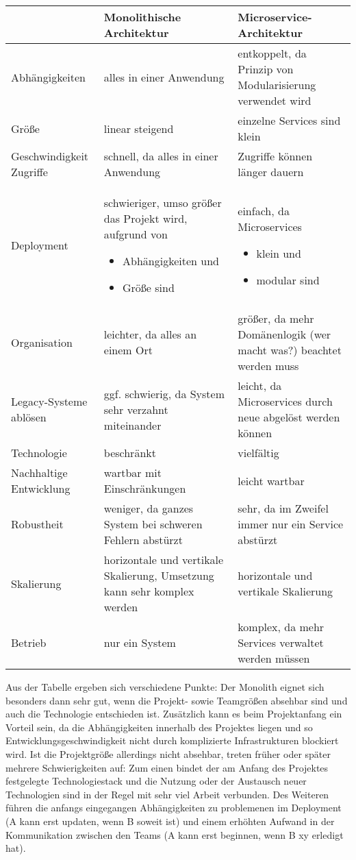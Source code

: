\begin{center}
	\begin{tabular}{p{5cm}p{5cm}p{5cm}}
		& Monolithische Architektur & Microservice-Architektur \\ \hline
		Abhängigkeiten & alles in einer Anwendung & entkoppelt, da Prinzip von Modularisierung verwendet wird \\
		Größe & linear steigend & einzelne Services sind klein \\
		Geschwindigkeit Zugriffe & schnell, da alles in einer Anwendung & Zugriffe können länger dauern \\ 
		Deployment & schwieriger, umso größer das Projekt wird, aufgrund von
		\begin{itemize}
			\item Abhängigkeiten und 
			\item Größe sind \end{itemize}
		 & einfach, da Microservices \begin{itemize}
			\item klein und 
		    \item modular sind \end{itemize} \\
		Organisation & leichter, da alles an einem Ort & größer, da mehr Domänenlogik (wer macht was?) beachtet werden muss \\
		Legacy-Systeme ablösen & ggf. schwierig, da System sehr verzahnt miteinander & leicht, da Microservices durch neue abgelöst werden können \\
		Technologie & beschränkt & vielfältig \\
		Nachhaltige Entwicklung & wartbar mit Einschränkungen & leicht wartbar \\
		Robustheit & weniger, da ganzes System bei schweren Fehlern abstürzt & sehr, da im Zweifel immer nur ein Service abstürzt \\
		Skalierung & horizontale und vertikale Skalierung, Umsetzung kann sehr komplex werden &  horizontale und vertikale Skalierung \\
		Betrieb & nur ein System & komplex, da mehr Services verwaltet werden müssen
	\end{tabular}
\end{center}


Aus der Tabelle ergeben sich verschiedene Punkte: Der Monolith eignet sich besonders dann sehr gut, wenn die Projekt- sowie Teamgrößen absehbar sind und auch die Technologie entschieden ist. Zusätzlich kann es beim Projektanfang ein Vorteil sein, da die Abhängigkeiten innerhalb des Projektes liegen und so Entwicklungsgeschwindigkeit nicht durch komplizierte Infrastrukturen blockiert wird. 
Ist die Projektgröße allerdings nicht absehbar, treten früher oder später mehrere Schwierigkeiten auf: Zum einen bindet der am Anfang des Projektes festgelegte Technologiestack und die Nutzung oder der Austausch neuer Technologien sind in der Regel mit sehr viel Arbeit verbunden. Des Weiteren führen die anfangs eingegangen Abhängigkeiten zu problemenen im Deployment (A kann erst updaten, wenn B soweit ist) und einem erhöhten Aufwand in der Kommunikation zwischen den Teams (A kann erst beginnen, wenn B xy erledigt hat). \\

